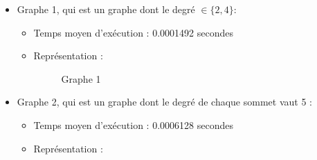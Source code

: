 \documentclass[a4paper, 11pt, oneside]{article}
\begin{document}
	\begin{itemize}
		\item Graphe 1, qui est un graphe dont le degré $\in \{2, 4\}$:
		\begin{itemize}
			\item Temps moyen d'exécution : 0.0001492 secondes
			\item Représentation :
			\begin{figure}[h]%
				\centering
				\qquad
				\caption{Graphe 1}%
				\label{fig:graphe1}%
			\end{figure}
		\end{itemize}
		\item Graphe 2, qui est un graphe dont le degré de chaque sommet vaut 5 :
		\begin{itemize}
			\item Temps moyen d'exécution : 0.0006128 secondes
			\item Représentation :
			\begin{figure}[h]%
				\centering

\end{figure}
\end{itemize}
\end{itemize}
\end{document}
